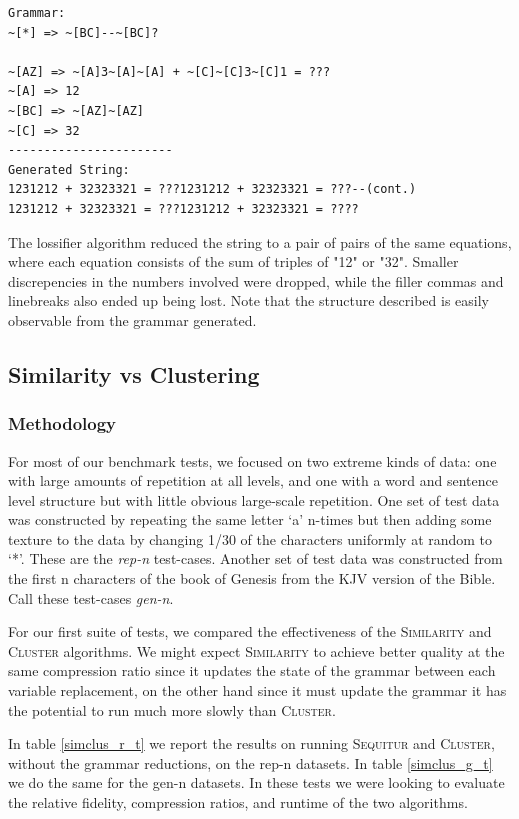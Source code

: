 \documentclass[11pt]{article}
\newcommand{\Sequitur}{\textsc{Sequitur}\xspace}
\newcommand{\Similarity}{\textsc{Similarity}\xspace}
\newcommand{\Cluster}{\textsc{Cluster}\xspace}
\begin{document}
\begin{verbatim}
Grammar:
~[*] => ~[BC]--~[BC]?

~[AZ] => ~[A]3~[A]~[A] + ~[C]~[C]3~[C]1 = ???
~[A] => 12
~[BC] => ~[AZ]~[AZ]
~[C] => 32
-----------------------
Generated String:
1231212 + 32323321 = ???1231212 + 32323321 = ???--(cont.)
1231212 + 32323321 = ???1231212 + 32323321 = ????
\end{verbatim}

The lossifier algorithm reduced the string to a pair of pairs of the same
equations, where each equation consists of the sum of triples of "12" or "32".
Smaller discrepencies in the numbers involved were dropped, while the filler
commas and linebreaks also ended up being lost. Note that the structure
described is easily observable from the grammar generated.

\subsection{Similarity vs Clustering}

\subsubsection{Methodology}

For most of our benchmark tests, we focused on two extreme kinds of data: one
with large amounts of repetition at all levels, and one with a word and
sentence level structure but with little obvious large-scale repetition.  One
set of test data was constructed by repeating the same letter `a' n-times but
then adding some texture to the data by changing 1/30 of the characters
uniformly at random to `*'. These are the \emph{rep-n} test-cases.
Another set of
test data was constructed from the first n characters of the book of Genesis
from the KJV version of the Bible. Call these test-cases \emph{gen-n}.

For our first suite of tests, we compared the effectiveness of the
\Similarity and \Cluster algorithms. We might expect \Similarity to
achieve better quality at the same compression ratio since it updates the state
of the grammar between each variable replacement, on the other hand since it
must update the grammar it has the potential to run much more slowly than
\Cluster.

In table \ref{simclus_r_t} we report the results on running \Sequitur and
\Cluster, without the grammar reductions, on the rep-n datasets. In table
\ref{simclus_g_t} we do the same for the gen-n datasets.
In these tests
we were looking to evaluate the relative fidelity, compression ratios, and runtime
of the two algorithms.
\end{document}
